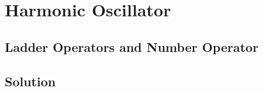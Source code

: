 \section{Harmonic Oscillator}
\subsection{Ladder Operators and Number Operator}
\subsection{Solution}